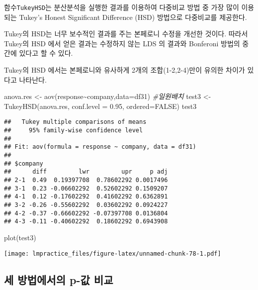 \documentclass[
]{book}
\newenvironment{Shaded}{\begin{snugshade}}{\end{snugshade}}
\newcommand{\AttributeTok}[1]{\textcolor[rgb]{0.77,0.63,0.00}{#1}}
\newcommand{\CommentTok}[1]{\textcolor[rgb]{0.56,0.35,0.01}{\textit{#1}}}
\newcommand{\ConstantTok}[1]{\textcolor[rgb]{0.00,0.00,0.00}{#1}}
\newcommand{\FloatTok}[1]{\textcolor[rgb]{0.00,0.00,0.81}{#1}}
\newcommand{\FunctionTok}[1]{\textcolor[rgb]{0.00,0.00,0.00}{#1}}
\newcommand{\NormalTok}[1]{#1}
\newcommand{\OtherTok}[1]{\textcolor[rgb]{0.56,0.35,0.01}{#1}}
\newcommand{\SpecialCharTok}[1]{\textcolor[rgb]{0.00,0.00,0.00}{#1}}
\begin{document}
함수\texttt{TukeyHSD}는 분산분석을 실행한 결과를 이용하여 다중비교 방법 중 가장
많이 이용되는 Tukey's Honest Significant Difference (HSD) 방법으로
다중비교를 제공한다.

Tukey의 HSD는 너무 보수적인 결과를 주는 본페로니 수정을 개선한 것이다.
따라서 Tukey의 HSD 에서 얻은 결과는 수정하지 않는 LDS 의 결과와 Bonferoni
방법의 중간에 있다고 할 수 있다.

Tukey의 HSD 에서는 본페로니와 유사하게 2개의 조합(1-2,2-4)만이 유의한
차이가 있다고 나타난다.

\begin{Shaded}
\begin{Highlighting}[]
\NormalTok{anova.res }\OtherTok{\textless{}{-}} \FunctionTok{aov}\NormalTok{(response}\SpecialCharTok{\textasciitilde{}}\NormalTok{company,}\AttributeTok{data=}\NormalTok{df31) }\CommentTok{\#일원배치}
\NormalTok{test3 }\OtherTok{\textless{}{-}} \FunctionTok{TukeyHSD}\NormalTok{(anova.res, }\AttributeTok{conf.level =} \FloatTok{0.95}\NormalTok{, }\AttributeTok{ordered=}\ConstantTok{FALSE}\NormalTok{)}
\NormalTok{test3}
\end{Highlighting}
\end{Shaded}

\begin{verbatim}
##   Tukey multiple comparisons of means
##     95% family-wise confidence level
## 
## Fit: aov(formula = response ~ company, data = df31)
## 
## $company
##      diff         lwr         upr     p adj
## 2-1  0.49  0.19397708  0.78602292 0.0017496
## 3-1  0.23 -0.06602292  0.52602292 0.1509207
## 4-1  0.12 -0.17602292  0.41602292 0.6362891
## 3-2 -0.26 -0.55602292  0.03602292 0.0924227
## 4-2 -0.37 -0.66602292 -0.07397708 0.0136804
## 4-3 -0.11 -0.40602292  0.18602292 0.6943908
\end{verbatim}

\begin{Shaded}
\begin{Highlighting}[]
\FunctionTok{plot}\NormalTok{(test3)}
\end{Highlighting}
\end{Shaded}

\texttt{[image: lmpractice\_files/figure-latex/unnamed-chunk-78-1.pdf]}

\hypertarget{uxc138-uxbc29uxbc95uxc5d0uxc11cuxc758-p-uxac12-uxbe44uxad50}{%
\subsection{세 방법에서의 p-값 비교}\label{uxc138-uxbc29uxbc95uxc5d0uxc11cuxc758-p-uxac12-uxbe44uxad50}}
\end{document}
